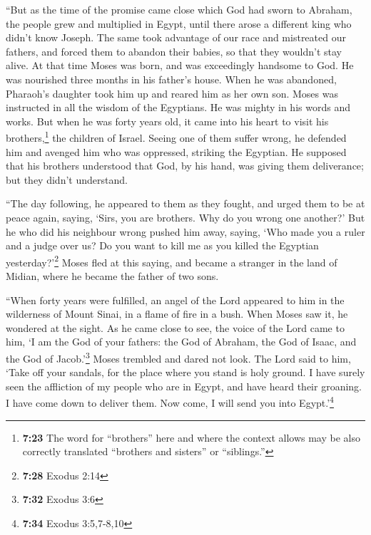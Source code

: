  ``But as the time of the promise came close which God
had sworn to Abraham, the people grew and multiplied in Egypt,
 until there arose a different king who didn't know
Joseph.  The same took advantage of our race and
mistreated our fathers, and forced them to abandon their babies, so that
they wouldn't stay alive.  At that time Moses was born,
and was exceedingly handsome to God. He was nourished three months in
his father's house.  When he was abandoned, Pharaoh's
daughter took him up and reared him as her own son. 
Moses was instructed in all the wisdom of the Egyptians. He was mighty
in his words and works.  But when he was forty years old,
it came into his heart to visit his brothers,\footnote{\textbf{7:23} The
  word for ``brothers'' here and where the context allows may be also
  correctly translated ``brothers and sisters'' or ``siblings.''} the
children of Israel.  Seeing one of them suffer wrong, he
defended him and avenged him who was oppressed, striking the Egyptian.
 He supposed that his brothers understood that God, by
his hand, was giving them deliverance; but they didn't understand.

 ``The day following, he appeared to them as they fought,
and urged them to be at peace again, saying, `Sirs, you are brothers.
Why do you wrong one another?'  But he who did his
neighbour wrong pushed him away, saying, `Who made you a ruler and a
judge over us?  Do you want to kill me as you killed the
Egyptian yesterday?'\footnote{\textbf{7:28} Exodus 2:14} 
Moses fled at this saying, and became a stranger in the land of Midian,
where he became the father of two sons.

 ``When forty years were fulfilled, an angel of the Lord
appeared to him in the wilderness of Mount Sinai, in a flame of fire in
a bush.  When Moses saw it, he wondered at the sight. As
he came close to see, the voice of the Lord came to him, 
`I am the God of your fathers: the God of Abraham, the God of Isaac, and
the God of Jacob.'\footnote{\textbf{7:32} Exodus 3:6} Moses trembled and
dared not look.  The Lord said to him, `Take off your
sandals, for the place where you stand is holy ground.  I
have surely seen the affliction of my people who are in Egypt, and have
heard their groaning. I have come down to deliver them. Now come, I will
send you into Egypt.'\footnote{\textbf{7:34} Exodus 3:5,7-8,10}

